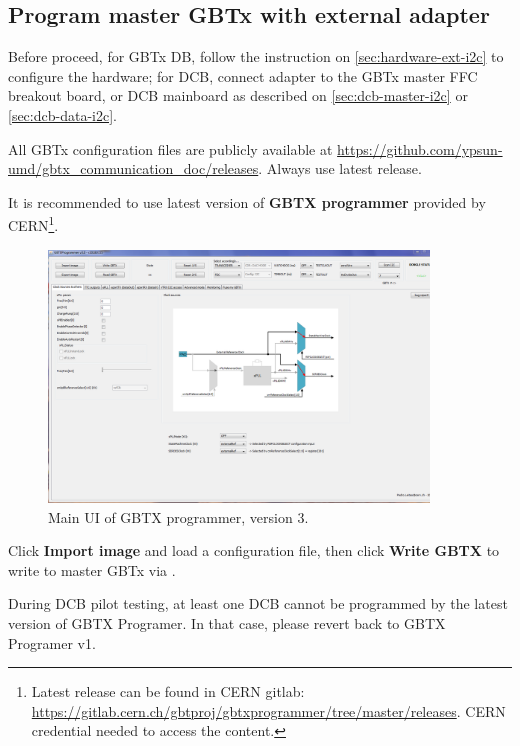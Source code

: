 \subsection{Program master GBTx with external \itwoc adapter}
Before proceed, for GBTx DB, follow the instruction on
\autoref{sec:hardware-ext-i2c} to configure the hardware;
for DCB, connect \itwoc adapter to the GBTx master FFC breakout board, or DCB
mainboard as described on \autoref{sec:dcb-master-i2c} or
\autoref{sec:dcb-data-i2c}.

All GBTx configuration files are publicly available at
\url{https://github.com/ypsun-umd/gbtx_communication_doc/releases}.
Always use latest release.

It is recommended to use latest version of \textbf{GBTX programmer} provided by
CERN\footnote{
    Latest release can be found in CERN gitlab:
    \url{https://gitlab.cern.ch/gbtproj/gbtxprogrammer/tree/master/releases}.
    CERN credential needed to access the content.
}.

\begin{figure}[!ht]
    \centering
    \includegraphics[width=0.9\textwidth]{res/gbtx_programmer_v3_ui.png}
    \caption{Main UI of GBTX programmer, version 3.}
    \label{fig:gbtx-programmer-ui}
\end{figure}

Click \textbf{Import image} and load a configuration file, then click
\textbf{Write GBTX} to write to master GBTx via \itwoc.

\begin{leftbar}
    During DCB pilot testing, at least one DCB cannot be programmed by the
    latest version of GBTX Programer.
    In that case, please revert back to GBTX Programer v1.
\end{leftbar}

